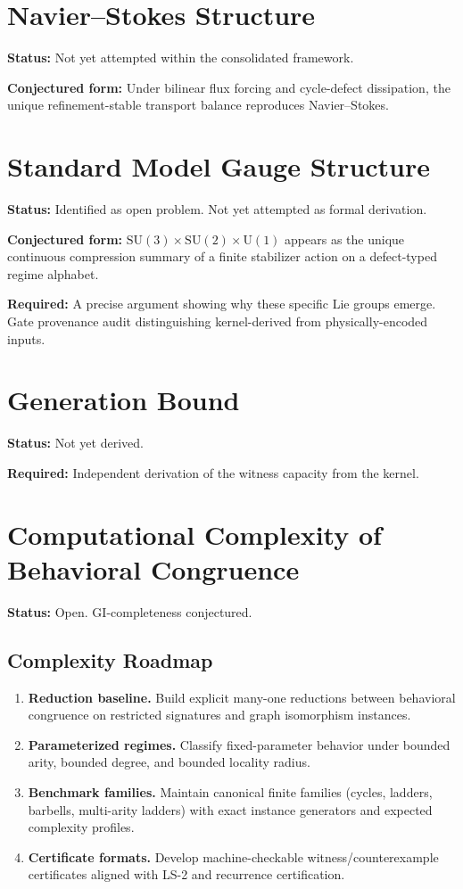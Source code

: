 \documentclass[11pt,a4paper]{article}
\theoremstyle{definition}
\theoremstyle{remark}
\begin{document}
\section{Navier--Stokes Structure}

\textbf{Status:} Not yet attempted within the consolidated framework.

\textbf{Conjectured form:} Under bilinear flux forcing and cycle-defect dissipation, the unique refinement-stable transport balance reproduces Navier--Stokes.

\section{Standard Model Gauge Structure}

\textbf{Status:} Identified as open problem. Not yet attempted as formal derivation.

\textbf{Conjectured form:} $\mathrm{SU}(3) \times \mathrm{SU}(2) \times \mathrm{U}(1)$ appears as the unique continuous compression summary of a finite stabilizer action on a defect-typed regime alphabet.

\textbf{Required:} A precise argument showing why these specific Lie groups emerge. Gate provenance audit distinguishing kernel-derived from physically-encoded inputs.

\section{Generation Bound}

\textbf{Status:} Not yet derived.

\textbf{Required:} Independent derivation of the witness capacity from the kernel.

\section{Computational Complexity of Behavioral Congruence}

\textbf{Status:} Open. GI-completeness conjectured.

\subsection*{Complexity Roadmap}
\begin{enumerate}[label=\textbf{C\arabic*.}]
  \item \textbf{Reduction baseline.} Build explicit many-one reductions between behavioral congruence on restricted signatures and graph isomorphism instances.
  \item \textbf{Parameterized regimes.} Classify fixed-parameter behavior under bounded arity, bounded degree, and bounded locality radius.
  \item \textbf{Benchmark families.} Maintain canonical finite families (cycles, ladders, barbells, multi-arity ladders) with exact instance generators and expected complexity profiles.
  \item \textbf{Certificate formats.} Develop machine-checkable witness/counterexample certificates aligned with LS-2 and recurrence certification.
\end{enumerate}
\end{document}

